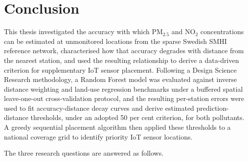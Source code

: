 \documentclass[11pt,a4paper]{article}
\let\oldsection\section
\renewcommand{\section}{\FloatBarrier\oldsection}
\begin{document}
\section{Conclusion}
\label{sec:conclusion}

This thesis investigated the accuracy with which PM$_{2.5}$ and NO$_2$ concentrations can be estimated at unmonitored locations from the sparse Swedish SMHI reference network, characterised how that accuracy degrades with distance from the nearest station, and used the resulting relationship to derive a data-driven criterion for supplementary IoT sensor placement. Following a Design Science Research methodology, a Random Forest model was evaluated against inverse distance weighting and land-use regression benchmarks under a buffered spatial leave-one-out cross-validation protocol, and the resulting per-station errors were used to fit accuracy-distance decay curves and derive estimated prediction-distance thresholds, under an adopted 50 per cent criterion, for both pollutants. A greedy sequential placement algorithm then applied these thresholds to a national coverage grid to identify priority IoT sensor locations.

The three research questions are answered as follows.
\end{document}
